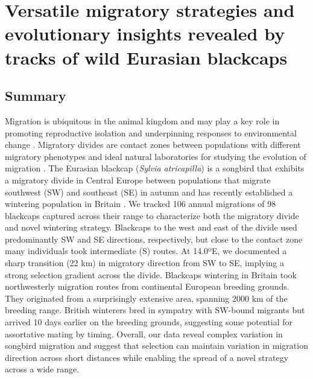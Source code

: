 \documentclass[a4paper, twoside]{templates/ociamthesis}
\begin{document}
\hypertarget{blackcap-geo}{%
\chapter{Versatile migratory strategies and evolutionary insights revealed by tracks of wild Eurasian blackcaps}\label{blackcap-geo}}

\minitoc 

\hypertarget{summary}{%
\section{Summary}\label{summary}}

Migration is ubiquitous in the animal kingdom and may play a key role in promoting reproductive isolation \autocite{bearhopAssortativeMatingMechanism2005,benschMorphologicalMolecularVariation1999,helbigSESWmigratingBlackcap1991,irwinSiberianMigratoryDivides2005} and underpinning responses to environmental change \autocite{bertholdRapidMicroevolutionMigratory1992,plummerSupplementaryFeedingGardens2015}.
Migratory divides are contact zones between populations with different migratory phenotypes and ideal natural laboratories for studying the evolution of migration \autocite{delmoreGeneticsSeasonalMigration2016,delmoreHybridSongbirdsEmploy2014}.
The Eurasian blackcap (\emph{Sylvia atricapilla}) is a songbird that exhibits a migratory divide in Central Europe between populations that migrate southwest (SW) and southeast (SE) in autumn \autocite{helbigInheritanceMigratoryDirection1991,helbigPopulationDifferentiationMigratory1992,helbigSESWmigratingBlackcap1991} and has recently established a wintering population in Britain \autocite{bearhopAssortativeMatingMechanism2005,bertholdMigratoryBehaviourPopulation1988,bertholdRapidMicroevolutionMigratory1992,leachWinteringBlackcapsBritain1981}. We tracked 106 annual migrations of 98 blackcaps captured across their range to characterize both the migratory divide and novel wintering strategy.
Blackcaps to the west and east of the divide used predominantly SW and SE directions, respectively, but close to the contact zone many individuals took intermediate (S) routes. At 14.0ºE, we documented a sharp transition (22 km) in migratory direction from SW to SE, implying a strong selection gradient across the divide.
Blackcaps wintering in Britain took northwesterly migration routes from continental European breeding grounds. They originated from a surprisingly extensive area, spanning 2000 km of the breeding range. British winterers bred in sympatry with SW-bound migrants but arrived 10 days earlier on the breeding grounds, suggesting some potential for assortative mating by timing.
Overall, our data reveal complex variation in songbird migration and suggest that selection can maintain variation in migration direction across short distances while enabling the spread of a novel strategy across a wide range.
\end{document}
